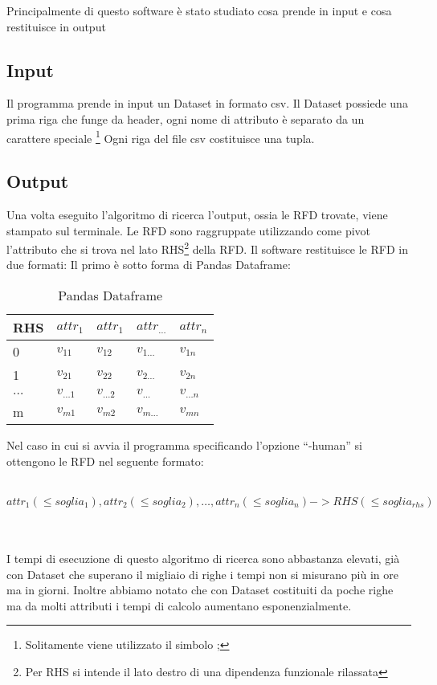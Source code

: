 Principalmente di questo software è stato studiato cosa prende in input e cosa restituisce in output

\subsection{Input}
Il programma prende in input un Dataset in formato csv.
Il Dataset possiede una prima riga che funge da header, ogni nome di attributo è separato da un carattere speciale \footnote{Solitamente viene utilizzato il simbolo  ;  }
Ogni riga del file csv costituisce una tupla.

\subsection{Output}
Una volta eseguito l’algoritmo di ricerca l’output, ossia le RFD trovate, viene stampato sul terminale. Le RFD sono raggruppate utilizzando come pivot l’attributo che si trova nel lato RHS\footnote{Per RHS si intende il lato destro di una dipendenza funzionale rilassata} della RFD. Il software restituisce le RFD in due formati:
Il primo è sotto forma di Pandas Dataframe:
\begin{table}[h]
    \centering
    \begin{tabular}{l  l  l  l  l }
     RHS & $attr_1$ & $attr_1$ &$attr_{\ldots}$ & $attr_n$ \\
    \hline
    0 & $v_{11}$ & $v_{12}$ & $v_{1\ldots}$ & $v_{1n}$\\
    1 & $v_{21}$ & $v_{22}$ & $v_{2\ldots}$ & $v_{2n}$\\
    $\ldots$ & $v_{\ldots1}$ & $v_{\ldots2}$ & $v_{\ldots}$ & $v_{\ldots n}$\\
    m & $v_{m1}$ & $v_{m2}$ & $v_{m\ldots}$ & $v_{mn}$\\
    \end{tabular}
    \caption{Pandas Dataframe}
    \label{tab:pandas_dataframe}
\end{table}


Nel caso in cui si avvia il programma specificando l’opzione “-human” si ottengono le RFD nel seguente formato:
\\~\\
\centerline{$attr_1(\leq soglia_1),attr_2(\leq soglia_2),\ldots,{attr_n}(\leq soglia_n)->RHS(\leq soglia_{rhs})$}
\\~\\
I tempi di esecuzione di questo algoritmo di ricerca sono abbastanza elevati, già con Dataset che superano il migliaio di righe i tempi non si misurano più in ore ma in giorni. Inoltre abbiamo notato che con Dataset costituiti da poche righe ma da molti attributi i tempi di calcolo aumentano esponenzialmente.